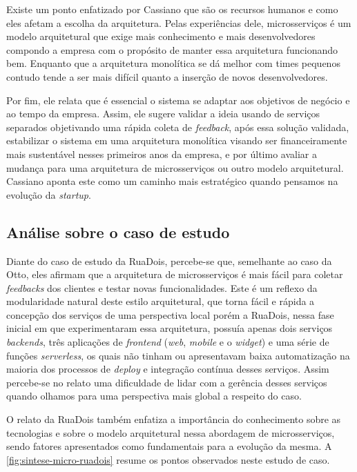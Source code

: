 Existe um ponto enfatizado por Cassiano que são os recursos humanos e como eles afetam a escolha da
arquitetura. Pelas experiências dele, microsserviços é um modelo arquitetural que exige mais conhecimento
e mais desenvolvedores compondo a empresa com o propósito de manter essa arquitetura funcionando bem.
Enquanto que a arquitetura monolítica se dá melhor com times pequenos contudo tende a ser mais difícil
quanto a inserção de novos desenvolvedores.

Por fim, ele relata que é essencial o sistema se adaptar aos objetivos de negócio e ao tempo da
empresa. Assim, ele sugere validar a ideia usando de serviços separados objetivando uma rápida coleta de
\textit{feedback}, após essa solução validada, estabilizar o sistema em uma arquitetura monolítica
visando ser financeiramente mais sustentável nesses primeiros anos da empresa, e por último avaliar
a mudança para uma arquitetura de microsserviços ou outro modelo arquitetural. Cassiano aponta este
como um caminho mais estratégico quando pensamos na evolução da \textit{startup}.

\subsection{Análise sobre o caso de estudo}

Diante do caso de estudo da RuaDois, percebe-se que, semelhante ao caso da Otto, eles afirmam que a
arquitetura de microsserviços é mais fácil para coletar \textit{feedbacks} dos clientes e testar
novas funcionalidades. Este é um reflexo da modularidade natural deste estilo arquitetural, que
torna fácil e rápida a concepção dos serviços de uma perspectiva local porém a RuaDois, nessa fase inicial
em que experimentaram essa arquitetura, possuía apenas dois serviços \textit{backends}, três
aplicações de \textit{frontend} (\textit{web}, \textit{mobile} e o \textit{widget}) e uma série de
funções \textit{serverless}, os quais não tinham ou apresentavam baixa automatização na maioria dos processos
de \textit{deploy} e integração contínua desses serviços. Assim percebe-se no relato uma dificuldade de
lidar com a gerência desses serviços quando olhamos para uma perspectiva mais global a respeito do caso.

O relato da RuaDois também enfatiza a importância do conhecimento sobre as tecnologias e sobre o
modelo arquitetural nessa abordagem de microsserviços, sendo fatores apresentados como fundamentais
para a evolução da mesma. A \autoref{fig:sintese-micro-ruadois} resume os pontos observados neste
estudo de caso.

